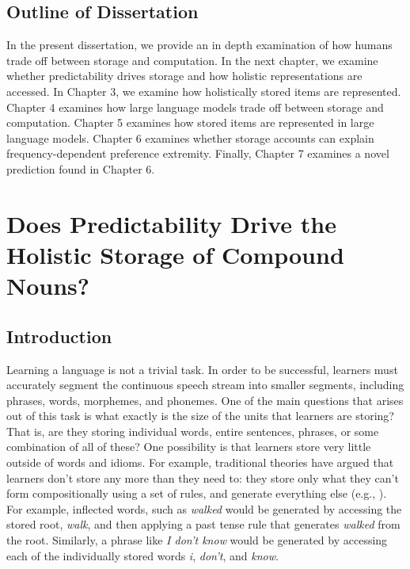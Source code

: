 \documentclass[
  12pt,
  letterpaper,
]{scrreprt}
\begin{document}
\section{Outline of Dissertation}\label{sec-outline-of-dissertation}

In the present dissertation, we provide an in depth examination of how
humans trade off between storage and computation. In the next chapter,
we examine whether predictability drives storage and how holistic
representations are accessed. In Chapter 3, we examine how holistically
stored items are represented. Chapter 4 examines how large language
models trade off between storage and computation. Chapter 5 examines how
stored items are represented in large language models. Chapter 6
examines whether storage accounts can explain frequency-dependent
preference extremity. Finally, Chapter 7 examines a novel prediction
found in Chapter 6.


\chapter{Does Predictability Drive the Holistic Storage of Compound
Nouns?}\label{does-predictability-drive-the-holistic-storage-of-compound-nouns}

\section{Introduction}\label{introduction-1}

Learning a language is not a trivial task. In order to be successful,
learners must accurately segment the continuous speech stream into
smaller segments, including phrases, words, morphemes, and phonemes. One
of the main questions that arises out of this task is what exactly is
the size of the units that learners are storing? That is, are they
storing individual words, entire sentences, phrases, or some combination
of all of these? One possibility is that learners store very little
outside of words and idioms. For example, traditional theories have
argued that learners don't store any more than they need to: they store
only what they can't form compositionally using a set of rules, and
generate everything else (e.g., ). For example, inflected words, such as \emph{walked} would be
generated by accessing the stored root, \emph{walk}, and then applying a
past tense rule that generates \emph{walked} from the root. Similarly, a
phrase like \emph{I don't know} would be generated by accessing each of
the individually stored words \emph{i}, \emph{don't}, and \emph{know}.
\end{document}

